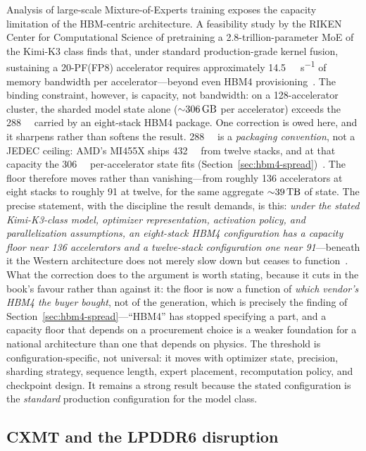 Analysis of large-scale Mixture-of-Experts training exposes the capacity limitation of the HBM-centric architecture. A feasibility study by the RIKEN Center for Computational Science of pretraining a 2.8-trillion-parameter MoE of the Kimi-K3 class finds that, under standard production-grade kernel fusion, sustaining a 20-PF(FP8) accelerator requires approximately \SI{14.5}{\tera\byte\per\second} of memory bandwidth per accelerator---beyond even HBM4 provisioning~\cite{riken-study}. The binding constraint, however, is capacity, not bandwidth: on a 128-accelerator cluster, the sharded model state alone (${\sim}\SI{306}{\giga\byte}$ per accelerator) exceeds the \SI{288}{\giga\byte} carried by an eight-stack HBM4 package. One correction is owed here, and it sharpens rather than softens the result. \SI{288}{\giga\byte} is a \emph{packaging convention}, not a JEDEC ceiling: AMD's MI455X ships \SI{432}{\giga\byte} from twelve stacks, and at that capacity the \SI{306}{\giga\byte} per-accelerator state fits (Section~\ref{sec:hbm4-spread})~\cite{hc2026-hbm4-spread}. The floor therefore moves rather than vanishing---from roughly 136 accelerators at eight stacks to roughly 91 at twelve, for the same aggregate ${\sim}\SI{39}{\tera\byte}$ of state. The precise statement, with the discipline the result demands, is this: \emph{under the stated Kimi-K3-class model, optimizer representation, activation policy, and parallelization assumptions, an eight-stack HBM4 configuration has a capacity floor near 136 accelerators and a twelve-stack configuration one near 91}---beneath it the Western architecture does not merely slow down but ceases to function~\cite{riken-study}. What the correction does to the argument is worth stating, because it cuts in the book's favour rather than against it: the floor is now a function of \emph{which vendor's HBM4 the buyer bought}, not of the generation, which is precisely the finding of Section~\ref{sec:hbm4-spread}---``HBM4'' has stopped specifying a part, and a capacity floor that depends on a procurement choice is a weaker foundation for a national architecture than one that depends on physics. The threshold is configuration-specific, not universal: it moves with optimizer state, precision, sharding strategy, sequence length, expert placement, recomputation policy, and checkpoint design. It remains a strong result because the stated configuration is the \emph{standard} production configuration for the model class.

\subsection{CXMT and the LPDDR6 disruption}

